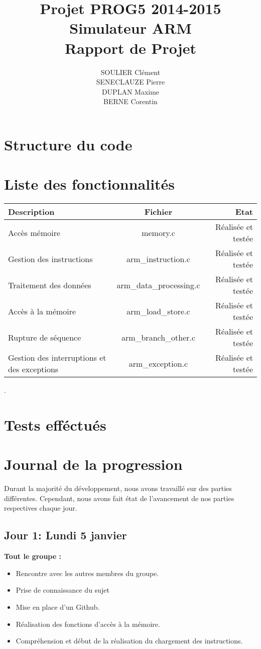 \documentclass[11pt]{article} %
\title{Projet PROG5 2014-2015 \\
Simulateur ARM \\
Rapport de Projet}
\author{SOULIER Clément \\
SENECLAUZE Pierre \\
DUPLAN Maxime \\
BERNE Corentin}
\begin{document}
\sffamily
\maketitle

\newpage
\section{Structure du code}

\newpage
\section{Liste des fonctionnalités}

\begin{tabular}{|l|c|r|}
  \hline
  Description & Fichier & Etat\\
  \hline
  Accès mémoire & memory.c & Réalisée et testée \\
  Gestion des instructions & arm\_instruction.c & Réalisée et testée \\
  Traitement des données & arm\_data\_processing.c & Réalisée et testée\\
  Accès à la mémoire & arm\_load\_store.c & Réalisée et testée\\
  Rupture de séquence & arm\_branch\_other.c & Réalisée et testée\\
  Gestion des interruptions et des exceptions & arm\_exception.c & Réalisée et testée \\
  \hline
\end{tabular}.

\newpage
\section{Tests efféctués}

\newpage 
\section{Journal de la progression}
 
Durant la majorit\'e du d\'eveloppement, nous avons travaill\'e sur des parties diff\'erentes. Cependant, nous avons fait \'etat de l'avancement de nos parties respectives chaque jour.

\subsection{Jour 1: Lundi 5 janvier}

\textbf{Tout le groupe :}
\begin{itemize}
  \item Rencontre avec les autres membres du groupe.
  \item Prise de connaissance du sujet
  \item Mise en place d'un Github.
  \item Réalisation des fonctions d'acc\`es \`a la m\'emoire.
  \item Compr\'ehension et début de la r\'ealisation du chargement des instructions.
\end{itemize}
\end{document}
